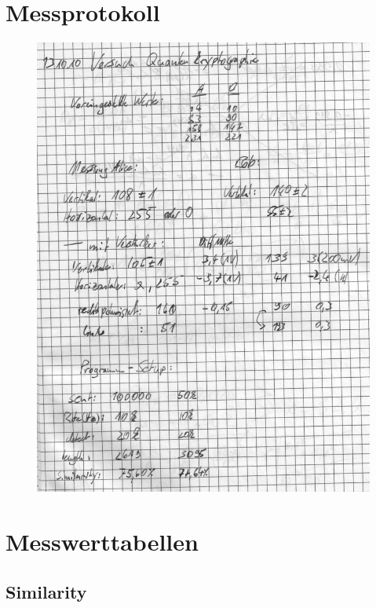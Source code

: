 \onecolumn
\section{Messprotokoll}
\label{sec:protokoll}
\begin{figure}[!ht]
        \centering
        \includegraphics[page=1,width=.88\textwidth,keepaspectratio]{../data/messprotokoll}
        \label{fig:protokoll}
\end{figure}

\section{Messwerttabellen}
\subsection{Similarity}
\label{sec:messwerttabellen}

\label{Schlüssellängen}
\label{sec:keylength}